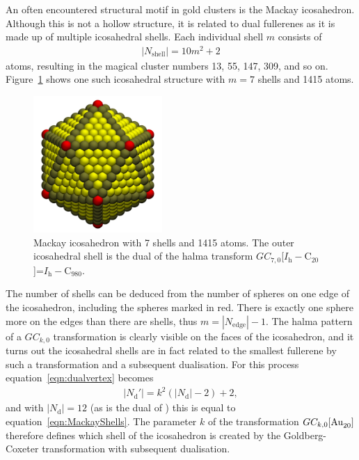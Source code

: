 An often encountered structural motif in gold clusters is the Mackay
icosahedron.\autocite{Nam2002,Wang-Wang-2011} Although this is not a hollow
structure, it is related to dual fullerenes as it is made up of multiple
icosahedral shells. Each individual shell $m$ consists of
%
\begin{align}
    |N_\text{shell}|=10m^2+2\label{eqn:MackayShells}
\end{align}
atoms, resulting in the magical cluster numbers 13, 55, 147, 309, and so
on.\autocite{Mackay-1962,Kuo_MackayAntiMackayDoubleMackay_2002}
Figure~\ref{fig:mackaylarge} shows one such icosahedral structure with $m=7$
shells and 1415 atoms.
%
\begin{figure}[htb]
    \begin{center}
    \includegraphics[width=4.9cm]{golddual/ico.jpg}
        \caption{Mackay icosahedron with 7 shells and 1415 atoms. The outer icosahedral shell is the dual of the halma transform $GC_{7,0}$[$I_\mathrm{h}-$C$_{20}$]=$I_\mathrm{h}-$C$_{980}$.}
    \label{fig:mackaylarge}
    \end{center}
\end{figure}
%
The number of shells can be deduced from the number of spheres on one edge of
the icosahedron,  including the spheres marked in red. There is exactly one
sphere more on the edges than there are shells, thus $m=|N_\text{edge}|-1$. The
halma pattern of a $GC_{k,0}$ transformation is clearly visible on the faces of
the icosahedron, and it turns out the icosahedral shells are in fact related to
the smallest fullerene  by such a transformation and a subsequent
dualisation. For this process equation~\eqref{eqn:dualvertex} becomes
%
\begin{align}
    |N_\text{d}'| = k^2(|N_\text{d}|-2) + 2,
\end{align}
%
and with $|N_\text{d}|=12$ (as  is the dual of ) this is equal
to equation~\eqref{eqn:MackayShells}. The parameter $k$ of the transformation
$GC_{k,0}[\ce{Au20}]$ therefore defines which shell of the icosahedron is
created by the Goldberg-Coxeter transformation with subsequent dualisation.

